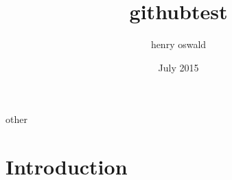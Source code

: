 \documentclass{article}
\title{githubtest}
\author{henry oswald}
\date{July 2015}
\begin{document}
\maketitle
other
\section{Introduction}
\end{document}
